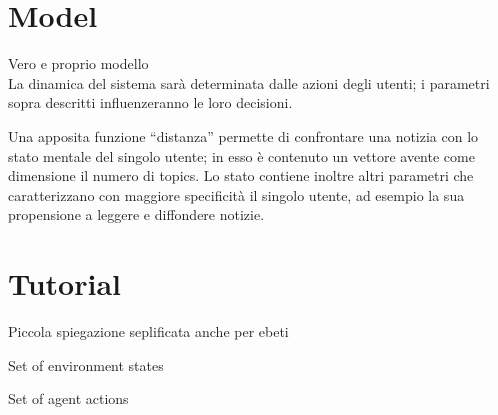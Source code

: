 \documentclass[11pt]{article} %
\begin{document}
\section{Model}

Vero e proprio modello
\\


La dinamica del sistema sarà determinata dalle azioni degli utenti; i parametri sopra descritti
influenzeranno le loro decisioni.


Una apposita funzione “distanza” permette di confrontare una notizia con lo stato mentale del
singolo utente; in esso è contenuto un vettore avente come dimensione il numero di topics. Lo stato
contiene inoltre altri parametri che caratterizzano con maggiore specificità il singolo utente, ad
esempio la sua propensione a leggere e diffondere notizie.

\section{Tutorial}
Piccola spiegazione seplificata anche per ebeti


 Set of environment states

 Set of agent actions
\end{document}
